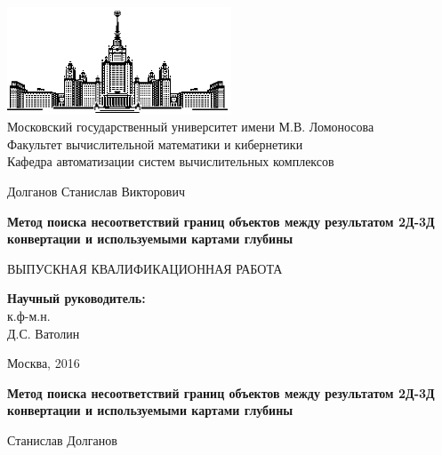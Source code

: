\documentclass[14pt, a4paper]{extarticle}
\begin{document}
\thispagestyle{empty}

\begin{center}
\ \vspace{-2.5cm}

\includegraphics[width=0.5\textwidth]{msu}\\
{Московский государственный университет имени М.В. Ломоносова}\\
Факультет вычислительной математики и кибернетики\\
Кафедра автоматизации систем вычислительных комплексов

\vspace{2.5cm}

{\Large Долганов Станислав Викторович}

\vspace{1cm}

{\Large\bfseries
Метод поиска несоответствий границ объектов между результатом 2Д-3Д конвертации 
и используемыми картами глубины\\}

\vspace{1cm}

{\large ВЫПУСКНАЯ КВАЛИФИКАЦИОННАЯ  РАБОТА}
\end{center}

\vfill

\begin{flushright}
  \textbf{Научный руководитель:}\\
  к.ф-м.н.\\
  Д.С. Ватолин
\end{flushright}

\vfill

\begin{center}
Москва, 2016
\end{center}

\enlargethispage{4\baselineskip}

\newpage

\textbf{Метод поиска несоответствий границ объектов между результатом 2Д-3Д конвертации 
и используемыми картами глубины}

\vspace{0.5cm}
Станислав Долганов
\vspace{0.5cm}
\end{document}
